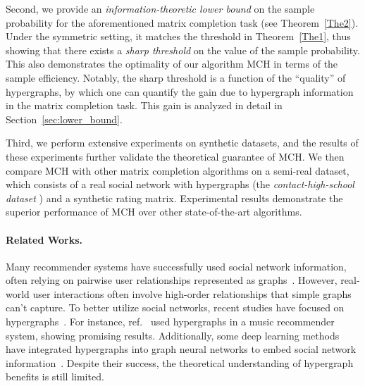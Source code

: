\documentclass{article}
\begin{document}
Second, we provide an \emph{information-theoretic lower bound} on the sample probability for the aforementioned matrix completion task (see Theorem~\ref{The2}). Under the symmetric setting, it matches the threshold in Theorem~\ref{The1}, thus showing that there exists a \emph{sharp threshold} on the value of the sample probability. This also demonstrates the optimality of our algorithm MCH in terms of the sample efficiency. Notably, the sharp threshold is a function of the ``quality'' of hypergraphs, by which one can quantify the gain due to hypergraph information in the matrix completion task. This gain is analyzed in detail in Section~\ref{sec:lower_bound}.


Third, we perform extensive experiments on synthetic datasets, and the results of these experiments further validate the theoretical guarantee of MCH. We then compare  MCH with other matrix completion algorithms on a semi-real dataset, which consists of a real social network with hypergraphs (the \emph{contact-high-school dataset} \citep{chodrow2021hypergraph, Mastrandrea-2015-contact}) and a synthetic rating matrix. Experimental results demonstrate the superior performance of MCH over other state-of-the-art algorithms.


     
\vspace{-4pt}
\paragraph{Related Works.} Many recommender systems have successfully used social network information, often relying on pairwise user relationships represented as graphs~\citep{eirinaki2018recommender, ma2008sorec}. However, real-world user interactions often involve high-order relationships that simple graphs can't capture. To better utilize social networks, recent studies have focused on hypergraphs~\cite{bu2010music, zheng2018novel}. For instance, ref.~\cite{bu2010music} used hypergraphs in a music recommender system, showing promising results. Additionally, some deep learning methods have integrated hypergraphs into graph neural networks to embed social network information~\citep{xia2022hypergraph, wei2022dynamic, yang2022multi, xia2022self}. Despite their success, the theoretical understanding of hypergraph benefits is still limited.
\end{document}
